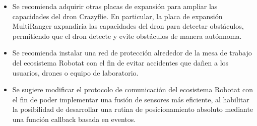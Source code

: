 
\begin{itemize}
	\item Se recomienda adquirir otras placas de expansión para ampliar las capacidades del dron Crazyflie. En particular, la placa de expansión MultiRanger axpandiría las capacidades del dron para detectar obstáculos, permitiendo que el dron detecte y evite obstáculos de manera autónnoma.
	
	\item Se recomienda instalar una red de protección alrededor de la mesa de trabajo del ecosistema Robotat con el fin de evitar accidentes que dañen a los usuarios, drones o equipo de laboratorio. 
	
	\item Se sugiere modificar el protocolo de comunicación del ecosistema Robotat con el fin de poder implementar una fusión de sensores más eficiente, al habilitar la posibilidad de desarrollar una rutina de posicionamiento absoluto mediante una función callback basada en eventos. 
\end{itemize}
